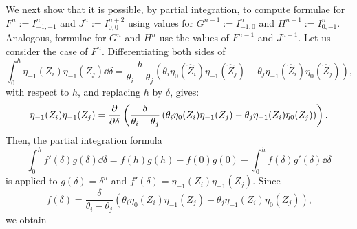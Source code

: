 We next show that it is possible, by partial integration, to compute formulae for $F^{n}:=I_{-1,-1}^{n}$ and $J^{n}:=I_{0,0}^{n+2}$ using values for $G^{n-1}:=I_{-1,0}^{n}$ and $H^{n-1}:=I_{0,-1}^{n}$. Analogous, formulae for $G^{n}$ and $H^{n}$ use the values of $F^{n-1}$ and $J^{n-1}$. Let us consider the case of $F^{n}$. Differentiating both sides of
$$
  \int^{h}_0 \eta_{-1}(Z_i)\eta_{-1}(Z_j)\dd \delta = \frac{h}{\theta_i - \theta_j}\left(\theta_i \eta_0(\hat{Z}_i)\eta_{-1}(\hat{Z}_j) - \theta_j \eta_{-1}(\hat{Z}_i)\eta_0(\hat{Z}_j)\right)\text{,}
$$
with respect to $h$, and replacing $h$ by $\delta$, gives:
$$
  \eta_{-1}(Z_i)\eta_{-1}(Z_j) = \pdv[]{}{\delta}\left(\frac{\delta}{\theta_i - \theta_j}\left(\theta_i \eta_0(Z_i)\eta_{-1}(Z_j) - \theta_j \eta_{-1}(Z_i)\eta_0(Z_j)\right)\right) \text{.}
$$
Then, the partial integration formula
$$
  \int_{0}^h f'(\delta)g(\delta) \dd \delta = f(h)g(h) - f(0)g(0) - \int_0^{h} f(\delta) g'(\delta) \dd \delta
$$
is applied to $g(\delta) = \delta^{n}$ and $f'(\delta) = \eta_{-1}(Z_i)\eta_{-1}(Z_j)$. Since
$$
  f(\delta) = \frac{\delta}{\theta_i - \theta_j}\left(\theta_i \eta_0(Z_i)\eta_{-1}(Z_j) - \theta_j \eta_{-1}(Z_i)\eta_0(Z_j)\right)\text{,}
$$
we obtain
